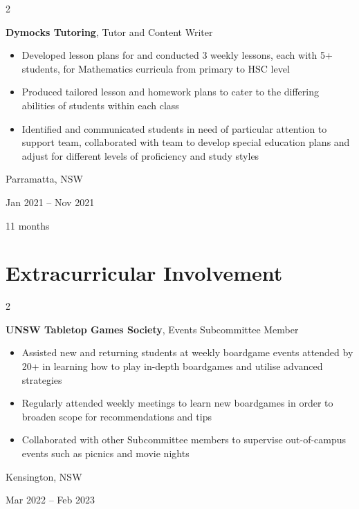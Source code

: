 \documentclass[10pt, a4paper]{article}
\newenvironment{highlights}{
    \begin{itemize}[
        topsep=0.10 cm,
        parsep=0.10 cm,
        partopsep=0pt,
        itemsep=0pt,
        leftmargin=0.4 cm + 10pt
    ]
}{
    \end{itemize}
} %
\newenvironment{twocolentry}[2][]{
    \onecolentry
    \def\secondColumn{#2}
    \setcolumnwidth{\fill, 4.5 cm}
    \begin{paracol}{2}
}{
    \switchcolumn \raggedleft \secondColumn
    \end{paracol}
    \endonecolentry
} %
\begin{document}
        \begin{twocolentry}{
            Parramatta, NSW

        Jan 2021 – Nov 2021

        11 months
        }
            \textbf{Dymocks Tutoring}, Tutor and Content Writer
            \begin{highlights}
                \item Developed lesson plans for and conducted 3 weekly lessons, each with 5+ students, for Mathematics curricula from primary to HSC level
                \item Produced tailored lesson and homework plans to cater to the differing abilities of students within each class
                \item Identified and communicated students in need of particular attention to support team, collaborated with team to develop special education plans and adjust for different levels of proficiency and study styles
            \end{highlights}
        \end{twocolentry}



    
    \section{Extracurricular Involvement}



        
        \begin{twocolentry}{
            Kensington, NSW

        Mar 2022 – Feb 2023
        }
            \textbf{UNSW Tabletop Games Society}, Events Subcommittee Member
            \begin{highlights}
                \item Assisted new and returning students at weekly boardgame events attended by 20+ in learning how to play in-depth boardgames and utilise advanced strategies
                \item Regularly attended weekly meetings to learn new boardgames in order to broaden scope for recommendations and tips
                \item Collaborated with other Subcommittee members to supervise out-of-campus events such as picnics and movie nights
            \end{highlights}
        \end{twocolentry}
\end{document}
